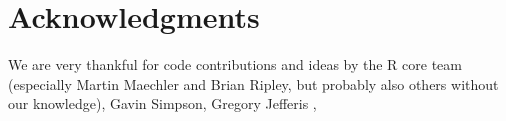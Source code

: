 \documentclass[shortnames,nojss,article]{jss}\usepackage[]{graphicx}\usepackage[]{color}
\begin{document}
% 
% 



\section*{Acknowledgments}

We are very thankful for code contributions and ideas by the R core team (especially Martin Maechler and Brian Ripley, but probably also others without our knowledge), Gavin Simpson, Gregory Jefferis
,






\vspace*{-0.35cm}
\end{document}
